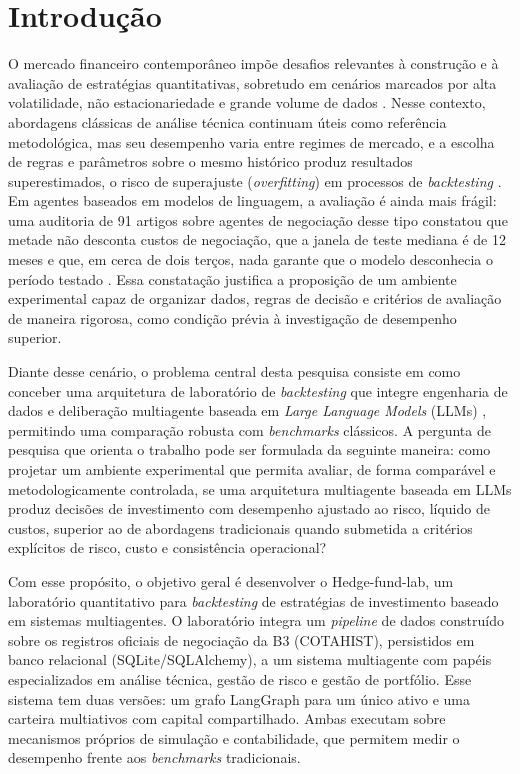 \chapter{Introdução}
\label{cha:introducao}

O mercado financeiro contemporâneo impõe desafios relevantes à construção e à avaliação de estratégias quantitativas, sobretudo em cenários marcados por alta volatilidade, não estacionariedade e grande volume de dados \citep{Lo2004}. Nesse contexto, abordagens clássicas de análise técnica continuam úteis como referência metodológica, mas seu desempenho varia entre regimes de mercado, e a escolha de regras e parâmetros sobre o mesmo histórico produz resultados superestimados, o risco de superajuste (\textit{overfitting}) em processos de \textit{backtesting} \citep{White2000, Bailey2017}. Em agentes baseados em modelos de linguagem, a avaliação é ainda mais frágil: uma auditoria de 91 artigos sobre agentes de negociação desse tipo constatou que metade não desconta custos de negociação, que a janela de teste mediana é de 12 meses e que, em cerca de dois terços, nada garante que o modelo desconhecia o período testado \citep{Zhang2026}. Essa constatação justifica a proposição de um ambiente experimental capaz de organizar dados, regras de decisão e critérios de avaliação de maneira rigorosa, como condição prévia à investigação de desempenho superior.

Diante desse cenário, o problema central desta pesquisa consiste em como conceber uma arquitetura de laboratório de \textit{backtesting} que integre engenharia de dados e deliberação multiagente baseada em \textit{Large Language Models} (LLMs) \citep{TradingAgents2024, Xia2026}, permitindo uma comparação robusta com \textit{benchmarks} clássicos. A pergunta de pesquisa que orienta o trabalho pode ser formulada da seguinte maneira: como projetar um ambiente experimental que permita avaliar, de forma comparável e metodologicamente controlada, se uma arquitetura multiagente baseada em LLMs produz decisões de investimento com desempenho ajustado ao risco, líquido de custos, superior ao de abordagens tradicionais quando submetida a critérios explícitos de risco, custo e consistência operacional?

Com esse propósito, o objetivo geral é desenvolver o Hedge-fund-lab, um laboratório quantitativo para \textit{backtesting} de estratégias de investimento baseado em sistemas multiagentes. O laboratório integra um \textit{pipeline} de dados construído sobre os registros oficiais de negociação da B3 (COTAHIST), persistidos em banco relacional (SQLite/SQLAlchemy), a um sistema multiagente com papéis especializados em análise técnica, gestão de risco e gestão de portfólio. Esse sistema tem duas versões: um grafo LangGraph para um único ativo e uma carteira multiativos com capital compartilhado. Ambas executam sobre mecanismos próprios de simulação e contabilidade, que permitem medir o desempenho frente aos \textit{benchmarks} tradicionais.

